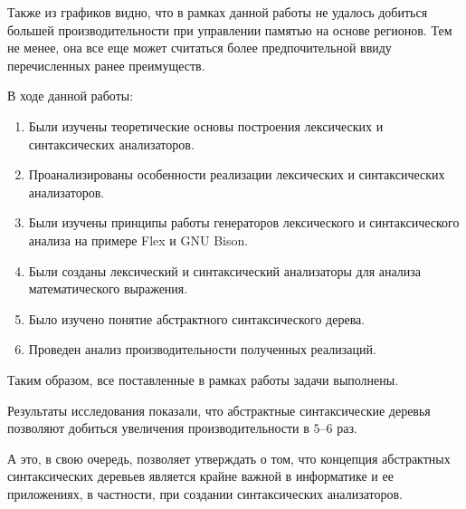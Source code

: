 \documentclass[bachelor, och, otchet]{SCWorks}
\begin{document}
Также из графиков видно, что в рамках данной работы не удалось добиться большей
производительности при управлении памятью на основе регионов. Тем не менее, она
все еще может считаться более предпочительной ввиду перечисленных ранее
преимуществ.

\conclusion

В ходе данной работы:

\begin{enumerate}
    \item Были изучены теоретические основы построения лексических и
    синтаксических анализаторов.
    \item Проанализированы особенности реализации лексических и синтаксических
    анализаторов.
    \item Были изучены принципы работы генераторов лексического и
    синтаксического анализа на примере Flex и GNU Bison.
    \item Были созданы лексический и синтаксический анализаторы для анализа
    математического выражения.
    \item Было изучено понятие абстрактного синтаксического дерева.
    \item Проведен анализ производительности полученных реализаций.
\end{enumerate}

Таким образом, все поставленные в рамках работы задачи выполнены.

Результаты исследования показали, что абстрактные синтаксические деревья
позволяют добиться увеличения производительности в $5$--$6$ раз.

А это, в свою очередь, позволяет утверждать о том, что концепция абстрактных
синтаксических деревьев является крайне важной в информатике и ее приложениях, в
частности, при создании синтаксических анализаторов.

%

%





\appendix 
\end{document}
